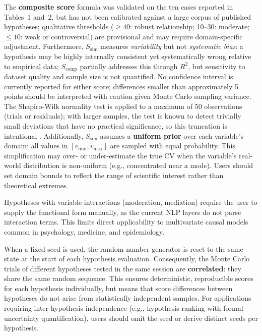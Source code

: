 \documentclass[12pt,a4paper]{article}
\begin{document}
The \textbf{composite score} formula was validated on the ten cases reported in
Tables~1 and~2, but has not been calibrated against a large corpus of published
hypotheses; qualitative thresholds ($\geq 40$: robust relationship; 10--30: moderate;
$\leq 10$: weak or controversial) are provisional and may require domain-specific
adjustment. Furthermore, $S_{\text{sim}}$ measures \textit{variability} but not
\textit{systematic bias}: a hypothesis may be highly internally consistent yet
systematically wrong relative to empirical data; $S_{\text{comp}}$ partially
addresses this through $R^2$, but sensitivity to dataset quality and sample
size is not quantified. No confidence interval is currently reported for either
score; differences smaller than approximately 5 points should be interpreted
with caution given Monte Carlo sampling variance. The Shapiro-Wilk
normality test is applied to a maximum of 50 observations (trials or
residuals); with larger samples, the test is known to detect trivially
small deviations that have no practical significance, so this truncation
is intentional \parencite{burnham2002}. Additionally, $S_{\text{sim}}$
assumes a \textbf{uniform prior} over each variable's domain: all values in
$[v_{\min}, v_{\max}]$ are sampled with equal probability. This simplification
may over- or under-estimate the true CV when the variable's real-world
distribution is non-uniform (e.g., concentrated near a mode). Users should
set domain bounds to reflect the range of scientific interest rather than
theoretical extremes.

Hypotheses with variable interactions (moderation, mediation) require the user
to supply the functional form manually, as the current NLP layers do not parse
interaction terms. This limits direct applicability to multivariate causal
models common in psychology, medicine, and epidemiology.

When a fixed seed is used, the random number generator is reset to the same
state at the start of each hypothesis evaluation. Consequently, the Monte Carlo
trials of different hypotheses tested in the same session are \textbf{correlated}:
they share the same random sequence. This ensures deterministic, reproducible
scores for each hypothesis individually, but means that score differences
between hypotheses do not arise from statistically independent samples.
For applications requiring inter-hypothesis independence (e.g., hypothesis
ranking with formal uncertainty quantification), users should omit the seed
or derive distinct seeds per hypothesis.
\end{document}

